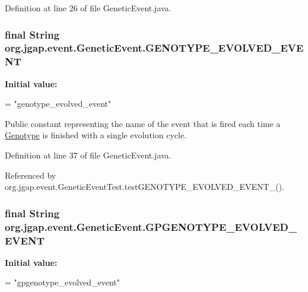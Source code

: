 Definition at line 26 of file Genetic\-Event.\-java.

\hypertarget{classorg_1_1jgap_1_1event_1_1_genetic_event_aeb761be1841e7284cd6502242f6f7110}{
\subsubsection[{G\-E\-N\-O\-T\-Y\-P\-E\-\_\-\-E\-V\-O\-L\-V\-E\-D\-\_\-\-E\-V\-E\-N\-T}]{\setlength{\rightskip}{0pt plus 5cm}final String org.\-jgap.\-event.\-Genetic\-Event.\-G\-E\-N\-O\-T\-Y\-P\-E\-\_\-\-E\-V\-O\-L\-V\-E\-D\-\_\-\-E\-V\-E\-N\-T\hspace{0.3cm}{\ttfamily [static]}}}\label{classorg_1_1jgap_1_1event_1_1_genetic_event_aeb761be1841e7284cd6502242f6f7110}
{\bfseries Initial value\-:}
\begin{DoxyCode}
=
      \textcolor{stringliteral}{"genotype\_evolved\_event"}
\end{DoxyCode}
Public constant representing the name of the event that is fired each time a \hyperlink{classorg_1_1jgap_1_1_genotype}{Genotype} is finished with a single evolution cycle. 

Definition at line 37 of file Genetic\-Event.\-java.



Referenced by org.\-jgap.\-event.\-Genetic\-Event\-Test.\-test\-G\-E\-N\-O\-T\-Y\-P\-E\-\_\-\-E\-V\-O\-L\-V\-E\-D\-\_\-\-E\-V\-E\-N\-T\-\_().

\hypertarget{classorg_1_1jgap_1_1event_1_1_genetic_event_a6fbe66a6b68922a67456d407784c5cdf}{
\subsubsection[{G\-P\-G\-E\-N\-O\-T\-Y\-P\-E\-\_\-\-E\-V\-O\-L\-V\-E\-D\-\_\-\-E\-V\-E\-N\-T}]{\setlength{\rightskip}{0pt plus 5cm}final String org.\-jgap.\-event.\-Genetic\-Event.\-G\-P\-G\-E\-N\-O\-T\-Y\-P\-E\-\_\-\-E\-V\-O\-L\-V\-E\-D\-\_\-\-E\-V\-E\-N\-T\hspace{0.3cm}{\ttfamily [static]}}}\label{classorg_1_1jgap_1_1event_1_1_genetic_event_a6fbe66a6b68922a67456d407784c5cdf}
{\bfseries Initial value\-:}
\begin{DoxyCode}
=
      \textcolor{stringliteral}{"gpgenotype\_evolved\_event"}
\end{DoxyCode}


